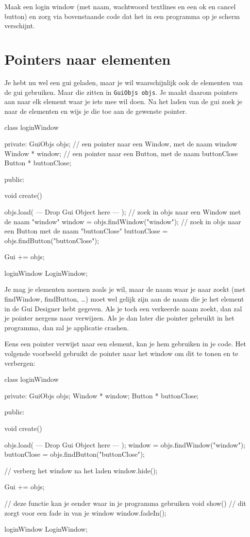 \begin{exercise}
Maak een login window (met naam, wachtwoord textlines en een ok en cancel button) en zorg via bovenstaande code dat het in een programma op je scherm verschijnt.
\end{exercise}

\section{Pointers naar elementen}
Je hebt nu wel een gui geladen, maar je wil waarschijnlijk ook de elementen van de gui gebruiken. Maar die zitten in \texttt{GuiObjs objs}. Je maakt daarom pointers aan naar elk element waar je iets mee wil doen. Na het laden van de gui zoek je naar de elementen en wijs je die toe aan de gewenste pointer.

\begin{code}
class loginWindow
{
private:
   GuiObjs objs;
	 // een pointer naar een Window, met de naam window
	 Window * window;
	 // een pointer naar een Button, met de naam buttonClose
	 Button * buttonClose;
   
public:

   void create()
   {
      objs.load( --- Drop Gui Object here --- );
			// zoek in objs naar een Window met de naam "window"
      window = objs.findWindow("window");
			// zoek in objs naar een Button met de naam "buttonClose"
			buttonClose = objs.findButton("buttonClose");
			
      Gui += objs;
   }
   
}
loginWindow LoginWindow;
\end{code}

Je mag je elementen noemen zoals je wil, maar de naam waar je naar zoekt (met findWindow, findButton, \ldots) moet wel gelijk zijn aan de naam die je het element in de Gui Designer hebt gegeven. Als je toch een verkeerde naam zoekt, dan zal je pointer nergens naar verwijzen. Als je dan later die pointer gebruikt in het programma, dan zal je applicatie crashen.

Eens een pointer verwijst naar een element, kan je hem gebruiken in je code. Het volgende voorbeeld gebruikt de pointer naar het window om dit te tonen en te verbergen:

\begin{code}
class loginWindow
{
private:
   GuiObjs objs;
	 Window * window;
	 Button * buttonClose;
   
public:

   void create()
   {
      objs.load( --- Drop Gui Object here --- );
      window = objs.findWindow("window");
			buttonClose = objs.findButton("buttonClose");
			
			// verberg het window na het laden
			window.hide();
			
      Gui += objs;
   }
	
	 // deze functie kan je eender waar in je programma gebruiken
	 void show() {
			// dit zorgt voor een fade in van je window	
	    window.fadeIn();
   }
}
loginWindow LoginWindow;
\end{code}

